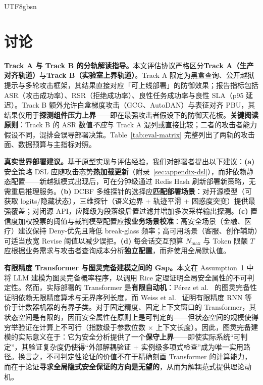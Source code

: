 \documentclass[letterpaper,twocolumn,10pt]{article}
\begin{document}
\begin{CJK}{UTF8}{gbsn}
\section{讨论}

\textbf{Track A 与 Track B 的分轨解读指导。}本文评估协议严格区分\textbf{Track A（生产对齐轨道）}与\textbf{Track B（实验室上界轨道）}。Track A 限定为黑盒查询、公开越狱提示与多轮攻击框架，其结果直接对应「可上线部署」的防御效果；报告指标包括 ASR（攻击成功率）、RSR（拒绝成功率）、良性任务成功率与良性 SLA（p95 延迟）。Track B 额外允许白盒梯度攻击（GCG、AutoDAN）与表征对齐 PBU，其结果仅用于\textbf{探测组件压力上界}——即在最强攻击者假设下的防御天花板。\textbf{关键阅读原则}：Track B 的 ASR 数值\emph{不应}与 Track A 混列或直接比较；二者的攻击者能力假设不同，混排会误导部署决策。Table~\ref{tab:eval-matrix} 完整列出了两轨的攻击面、数据预算与主指标对照。

\textbf{真实世界部署建议。}基于原型实现与评估经验，我们对部署者提出以下建议：\textbf{(a)} 安全策略 DSL 应随攻击态势\textbf{热加载更新}（附录~\ref{sec:appendix-dsl}），而非依赖静态配置——新越狱模式出现后，可在分钟级通过 Redis Hash 刷新部署新策略，无需重启推理服务。\textbf{(b)} DCBF 多维探针的选择应\textbf{匹配部署场景}：对开源模型（可获取 logits/隐藏状态），三维探针（语义边界 + 轨迹平滑 + 困惑度突变）提供最强覆盖；对闭源 API，应降级为段落级后置过滤并增加多次采样输出探测。\textbf{(c)} 置信度加权投票的阈值与裁判模型配置应\textbf{按业务场景校准}：高安全场景（金融、医疗）建议保持 Deny-优先且降低 break-glass 频率；高可用场景（客服、创作辅助）可适当放宽 Revise 阈值以减少误拒。\textbf{(d)} 每会话交互预算 $N_{\max}$ 与 Token 限额 $T$ 应根据业务需求与攻击者查询成本分析\textbf{独立配置}，而非使用全局默认值。

\textbf{有限精度 Transformer 与图灵完备建模之间的 Gap。}本文在 Assumption~1 中将 LLM 建模为图灵完备概率程序，以调用 Rice 定理证明全局安全属性的不可判定性。然而，实际部署的 Transformer 是\textbf{有限自动机}：P\'{e}rez et al.~\cite{perez-turing-2021} 的图灵完备性证明依赖无限精度算术与无界序列长度，而 Weiss et al.~\cite{weiss-rnn-counter-2018} 证明有限精度 RNN 等价于计数器机器的有界子类。对于固定精度、固定上下文窗口的 Transformer，其状态空间是有限的，因而安全属性在原则上是可判定的——但状态空间的规模使得穷举验证在计算上不可行（指数级于参数位数 $\times$ 上下文长度）。因此，图灵完备建模的实际意义在于：它为安全分析提供了一个\textbf{保守上界}——即使实际系统``可判定''，其验证复杂度仍使得``外部解耦验证 + 实例级多项式检查''成为唯一实用路径。换言之，不可判定性论证的价值不在于精确刻画 Transformer 的计算能力，而在于论证\textbf{寻求全局隐式安全保证的方向是无望的}，从而为解耦范式提供理论动机。


\end{CJK}
\end{document}

